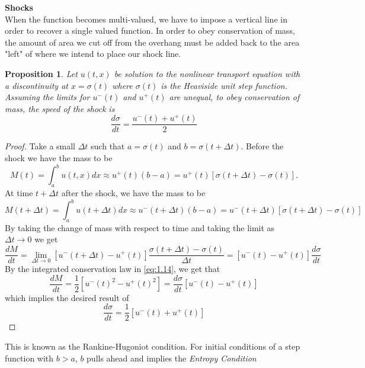 \documentclass{article}
\newcommand{\od}[2]{\frac{d #1}{d #2}}
\newtheorem{proposition}[theorem]{Proposition}
\numberwithin{equation}{section}
\begin{document}
\textbf{Shocks}\\
When the function becomes multi-valued, we have to impose a vertical line in order to recover a single valued function. In order to obey conservation of mass, the amount of area we cut off from the overhang must be added back to the area "left" of where we intend to place our shock line. 
\begin{proposition}
    Let $u(t,x)$ be solution to the nonlinear transport equation with a discontinuity at $x=\sigma(t)$ where $\sigma(t)$ is the Heaviside unit step function. Assuming the limits for $u^-(t)$ and $u^+(t)$ are unequal, to obey conservation of mass, the speed of the shock is 
    \begin{equation*}
        \od{\sigma}{t} = \frac{u^-(t)+u^+(t)}{2}
    \end{equation*}
\end{proposition}
\begin{proof}
    Take a small $\Delta t$ such that $a=\sigma(t)$ and $b=\sigma(t+\Delta t)$. Before the shock we have the mass to be 
    \begin{equation*}
        M(t) = \int^b_au(t,x)dx \approx u^+(t)(b-a) = u^+(t)[\sigma(t+\Delta t)-\sigma(t)].
    \end{equation*}
    At time $t+\Delta t$ after the shock, we have the mass to be 
    \begin{equation*}
        M(t+\Delta t) = \int^b_au(t+\Delta t)dx \approx u^-(t+\Delta t)(b-a)=u^-(t+\Delta t)[\sigma(t+\Delta t)-\sigma(t)]
    \end{equation*}
    By taking the change of mass with respect to time and taking the limit as $\Delta t \rightarrow 0$ we get 
    \begin{equation*}
        \od{M}{t} = \lim_{\Delta t \rightarrow 0}[u^-(t+\Delta t)-u^+(t)]\frac{\sigma(t+\Delta t)-\sigma(t)}{\Delta t} = [u^-(t)-u^+(t)]\od{\sigma}{t}
    \end{equation*}
    By the integrated conservation law in \eqref{eq:1.14}, we get that 
    \begin{equation*}
        \od{M}{t} = \frac{1}{2}[u^-(t)^2-u^+(t)^2] = \od{\sigma}{t}[u^-(t)-u^+(t)]
    \end{equation*}
    which implies the desired result of
    \begin{equation*}
        \od{\sigma}{t} = \frac{1}{2}[u^-(t)+u^+(t)]
    \end{equation*}
\end{proof}
This is known as the Rankine-Hugoniot condition. For initial conditions of a step function with $b>a$, $b$ pulls ahead and implies the \textit{Entropy Condition} 
\end{document}
